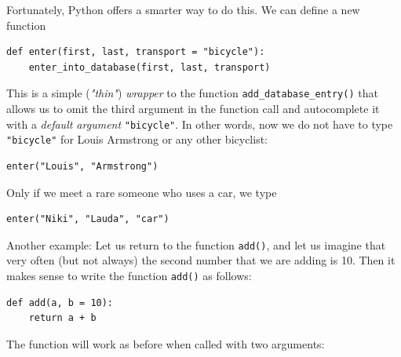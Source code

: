 Fortunately, Python offers a smarter way to do this. We can define a new function 

\begin{verbatim}
def enter(first, last, transport = "bicycle"):
    enter_into_database(first, last, transport)
\end{verbatim}
This is a simple ({\em "thin"}) {\em wrapper} to the function {\tt add\_database\_entry()} 
that allows us to omit the third argument in the function call and autocomplete 
it with a {\em default argument} {\tt "bicycle"}. In other words, now we do not have to 
type {\tt "bicycle"} for Louis Armstrong or any other bicyclist:

\begin{verbatim}
enter("Louis", "Armstrong")
\end{verbatim}
Only if we meet a rare someone who uses a car, we type 

\begin{verbatim}
enter("Niki", "Lauda", "car")
\end{verbatim}
Another example: Let us return to the function {\tt add()}, and let us 
imagine that very often (but not always) the second number that we
are adding is 10. Then it makes sense to write the function {\tt add()}
as follows:

\begin{verbatim}
def add(a, b = 10):
    return a + b
\end{verbatim}
The function will work as before when called with two arguments: 


